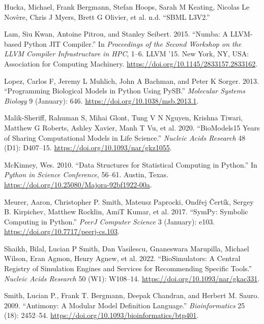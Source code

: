 \documentclass[
  letterpaper,
  DIV=11,
  numbers=noendperiod]{scrartcl}
\newlength{\cslhangindent}
\newlength{\cslentryspacingunit} %
\newenvironment{CSLReferences}[2] %
 {%
  \setlength{\parindent}{0pt}
  \ifodd #1
  \let\oldpar\par
  \def\par{\hangindent=\cslhangindent\oldpar}
  \fi
  \setlength{\parskip}{#2\cslentryspacingunit}
 }%
 {}
\begin{document}
\begin{CSLReferences}{1}{0}
\leavevmode{}%
Hucka, Michael, Frank Bergmann, Stefan Hoops, Sarah M Keating, Nicolas
Le Novère, Chris J Myers, Brett G Olivier, et al. n.d. {``{SBML
L3V2}.''}

\leavevmode{}%
Lam, Siu Kwan, Antoine Pitrou, and Stanley Seibert. 2015. {``Numba: A
{LLVM-based Python JIT} Compiler.''} In \emph{Proceedings of the {Second
Workshop} on the {LLVM Compiler Infrastructure} in {HPC}}, 1--6. {LLVM}
'15. {New York, NY, USA}: {Association for Computing Machinery}.
\url{https://doi.org/10.1145/2833157.2833162}.

\leavevmode{}%
Lopez, Carlos F, Jeremy L Muhlich, John A Bachman, and Peter K Sorger.
2013. {``Programming Biological Models in {Python} Using {PySB}.''}
\emph{Molecular Systems Biology} 9 (January): 646.
\url{https://doi.org/10.1038/msb.2013.1}.

\leavevmode{}%
Malik-Sheriff, Rahuman S, Mihai Glont, Tung V N Nguyen, Krishna Tiwari,
Matthew G Roberts, Ashley Xavier, Manh T Vu, et al. 2020.
{``{BioModels}{\textemdash}15 Years of Sharing Computational Models in
Life Science.''} \emph{Nucleic Acids Research} 48 (D1): D407--15.
\url{https://doi.org/10.1093/nar/gkz1055}.

\leavevmode{}%
McKinney, Wes. 2010. {``Data {Structures} for {Statistical Computing} in
{Python}.''} In \emph{Python in {Science Conference}}, 56--61. {Austin,
Texas}. \url{https://doi.org/10.25080/Majora-92bf1922-00a}.

\leavevmode{}%
Meurer, Aaron, Christopher P. Smith, Mateusz Paprocki, Ondřej Čertík,
Sergey B. Kirpichev, Matthew Rocklin, AmiT Kumar, et al. 2017.
{``{SymPy}: Symbolic Computing in {Python}.''} \emph{PeerJ Computer
Science} 3 (January): e103. \url{https://doi.org/10.7717/peerj-cs.103}.

\leavevmode{}%
Shaikh, Bilal, Lucian P Smith, Dan Vasilescu, Gnaneswara Marupilla,
Michael Wilson, Eran Agmon, Henry Agnew, et al. 2022.
{``{BioSimulators}: A Central Registry of Simulation Engines and
Services for Recommending Specific Tools.''} \emph{Nucleic Acids
Research} 50 (W1): W108--14. \url{https://doi.org/10.1093/nar/gkac331}.

\leavevmode{}%
Smith, Lucian P., Frank T. Bergmann, Deepak Chandran, and Herbert M.
Sauro. 2009. {``Antimony: A Modular Model Definition Language.''}
\emph{Bioinformatics} 25 (18): 2452--54.
\url{https://doi.org/10.1093/bioinformatics/btp401}.

\end{CSLReferences}
\end{document}
